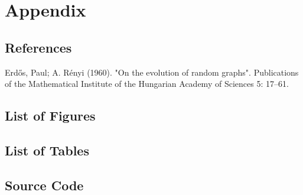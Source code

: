 \documentclass[11pt]{article}
\begin{document}
\section{Appendix}

\subsection{References}

Erdős, Paul; A. Rényi (1960). "On the evolution of random graphs". Publications of the Mathematical Institute of the Hungarian Academy of Sciences 5: 17–61.

\subsection{List of Figures}

\subsection{List of Tables}

\subsection{Source Code}
\end{document}
